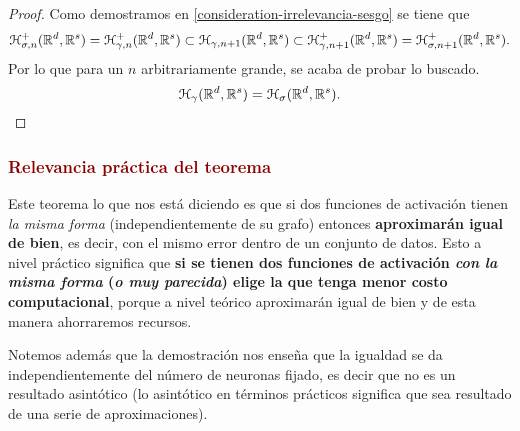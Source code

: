 \begin{aportacionOriginal}
\begin{proof}
    Como demostramos en \ref{consideration-irrelevancia-sesgo} se tiene que 
    \begin{equation*}
        \mathcal{H}^+_{\sigma, n}(\mathbb{R}^d, \mathbb{R}^s) = \mathcal{H}^+_{\gamma, n}(\mathbb{R}^d, \mathbb{R}^s) 
        \subset 
            \mathcal{H}_{\gamma, n+1}(\mathbb{R}^d, \mathbb{R}^s) 
        \subset
        \mathcal{H}^+_{\gamma, {n+1}}(\mathbb{R}^d, \mathbb{R}^s) = \mathcal{H}^+_{\sigma, {n+1}}(\mathbb{R}^d, \mathbb{R}^s) 
        .
    \end{equation*}
    Por lo que para un $n$ arbitrariamente grande, se acaba de probar lo buscado. 
    \begin{equation*}
        \mathcal{H}_{\gamma}(\mathbb{R}^d, \mathbb{R}^s) = \mathcal{H}_{\sigma}(\mathbb{R}^d, \mathbb{R}^s).
    \end{equation*}
\end{proof}
\end{aportacionOriginal}



\subsubsection*{\iconoClave  \textcolor{darkRed}{Relevancia práctica del teorema}}
Este teorema lo que nos está diciendo es que si dos funciones de activación tienen \textit{la misma forma}
(independientemente de su grafo)
entonces \textbf{aproximarán igual de bien},
es decir, con el mismo error dentro de un conjunto de datos.
 Esto a nivel práctico  significa que \textbf{si se tienen dos funciones de activación
  \textit{con la misma forma} (\textit{o muy parecida}) elige
   la que tenga menor costo computacional}, porque a 
   nivel teórico aproximarán igual de bien y de esta
    manera ahorraremos recursos. 

Notemos además que la demostración nos enseña que la igualdad se da independientemente del número de 
neuronas fijado, es decir que no es un resultado 
asintótico (lo asintótico en términos prácticos 
significa que sea resultado de una serie de 
aproximaciones).  


